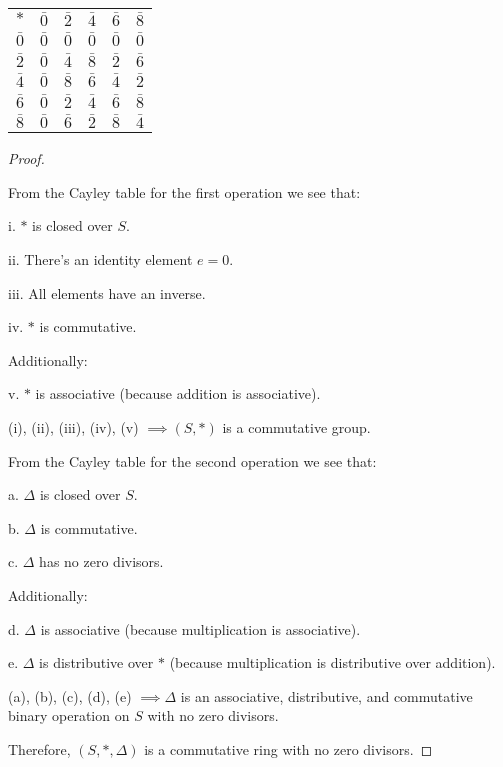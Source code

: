 \documentclass{article}
\begin{document}
\begin{tabular}{c | c c c c c}
  $*$ & $\bar{0}$ & $\bar{2}$ & $\bar{4}$ & $\bar{6}$ & $\bar{8}$ \\
  \cline{1-6}
  {$\bar{0}$} & $\bar{0}$ & $\bar{0}$ & $\bar{0}$ & $\bar{0}$ & $\bar{0}$ \\
  {$\bar{2}$} & $\bar{0}$ & $\bar{4}$ & $\bar{8}$ & $\bar{2}$ & $\bar{6}$ \\
  {$\bar{4}$} & $\bar{0}$ & $\bar{8}$ & $\bar{6}$ & $\bar{4}$ & $\bar{2}$ \\
  {$\bar{6}$} & $\bar{0}$ & $\bar{2}$ & $\bar{4}$ & $\bar{6}$ & $\bar{8}$ \\
  {$\bar{8}$} & $\bar{0}$ & $\bar{6}$ & $\bar{2}$ & $\bar{8}$ & $\bar{4}$ \\
\end{tabular}
\newline

\begin{proof}
  $ $
  
\noindent
From the Cayley table for the first operation we see that: 

i. $*$ is closed over $S$.

ii. There's an identity element $e=0$.

iii. All elements have an inverse.

iv. $*$ is commutative.

\noindent
Additionally:

v. $*$ is associative (because addition is associative).
\newline

\noindent
(i), (ii), (iii), (iv), (v) $\implies (S, *)$ is a commutative group.
\newline

\noindent
From the Cayley table for the second operation we see that:

a. $\Delta$ is closed over $S$.

b. $\Delta$ is commutative.

c. $\Delta$ has no zero divisors.

\noindent
Additionally:

d. $\Delta$ is associative (because multiplication is associative).

e. $\Delta$ is distributive over $*$ (because multiplication is distributive over addition).
\newline

\noindent
(a), (b), (c), (d), (e) $\implies \Delta$ is an associative, distributive, and commutative binary operation on $S$ with no zero divisors.
\newline

\noindent
Therefore, $(S, *, \Delta)$ is a commutative ring with no zero divisors.

\end{proof}
\end{document}
